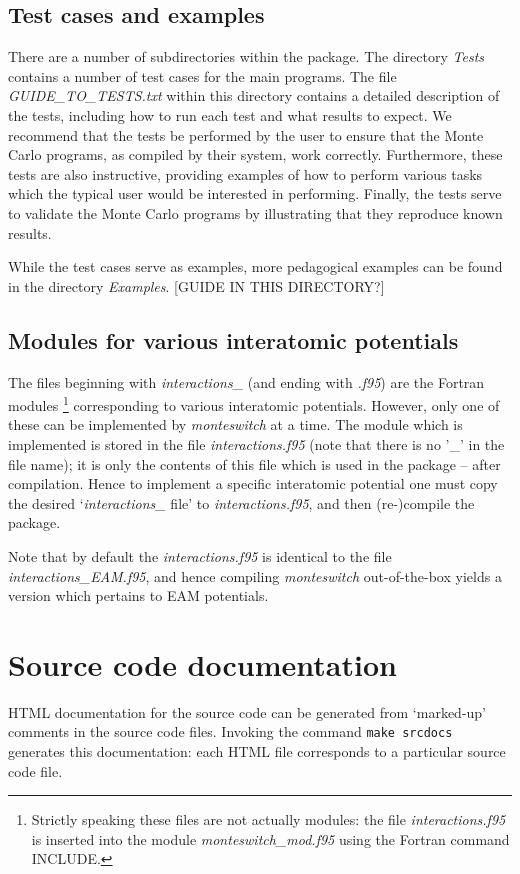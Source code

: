 \documentclass{report}
\begin{document}
\subsection{Test cases and examples}
There are a number of subdirectories within the package. The directory \emph{Tests} contains a number of test cases for the main programs. The file
\emph{GUIDE\_TO\_TESTS.txt} within this directory contains a detailed description of the tests, including how to run each test and what results 
to expect. We recommend that the tests be performed by the user to ensure that the Monte Carlo programs, as compiled by their system, work
correctly. Furthermore, these tests are also instructive, providing examples of how to perform various tasks which the typical user would be 
interested in performing. Finally, the tests serve to validate the Monte Carlo programs by illustrating that they reproduce known results.

While the test cases serve as examples, more pedagogical examples can be found in the directory \emph{Examples}. [GUIDE IN THIS DIRECTORY?]

\subsection{Modules for various interatomic potentials}
The files beginning with \emph{interactions\_} (and ending with \emph{.f95}) are the Fortran modules
\footnote{Strictly speaking these files are not actually modules: the file \emph{interactions.f95} is inserted into the module 
\emph{monteswitch\_mod.f95} using the Fortran command INCLUDE.}
corresponding to various interatomic potentials. However, only one of these can be implemented by \emph{monteswitch} at a time. The module
which is implemented is stored in the file \emph{interactions.f95} (note that there is no '\_' in the file name); it is only the contents of
this file which is used in the package -- after compilation. Hence to implement a specific interatomic potential one must copy
the desired `\emph{interactions\_} file' to \emph{interactions.f95}, and then (re-)compile the package.

Note that by default the \emph{interactions.f95} is identical to the file \emph{interactions\_EAM.f95}, and hence compiling \emph{monteswitch}
out-of-the-box yields a version which pertains to EAM potentials.

\section{Source code documentation}
HTML documentation for the source code can be generated from `marked-up' comments in the source code files. Invoking the command \texttt{make srcdocs}
generates this documentation: each HTML file corresponds to a particular source code file.
\end{document}
